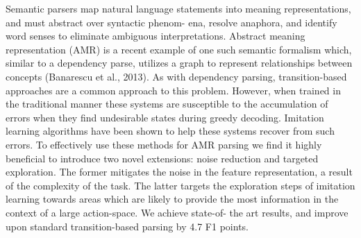 Semantic parsers map natural language statements into meaning representations, and must abstract over syntactic phenom- ena, resolve anaphora, and identify word senses to eliminate ambiguous interpretations. Abstract meaning representation (AMR) is a recent example of one such semantic formalism which, similar to a dependency parse, utilizes a graph to represent relationships between concepts (Banarescu et al., 2013). As with dependency parsing, transition-based approaches are a common approach to this problem. However, when trained in the traditional manner these systems are susceptible to the accumulation of errors when they find undesirable states during greedy decoding. Imitation learning algorithms have been shown to help these systems recover from such errors. To effectively use these methods for AMR parsing we find it highly beneficial to introduce two novel extensions: noise reduction and targeted exploration. The former mitigates the noise in the feature representation, a result of the complexity of the task. The latter targets the exploration steps of imitation learning towards areas which are likely to provide the most information in the context of a large action-space. We achieve state-of- the art results, and improve upon standard transition-based parsing by 4.7 F1 points.

